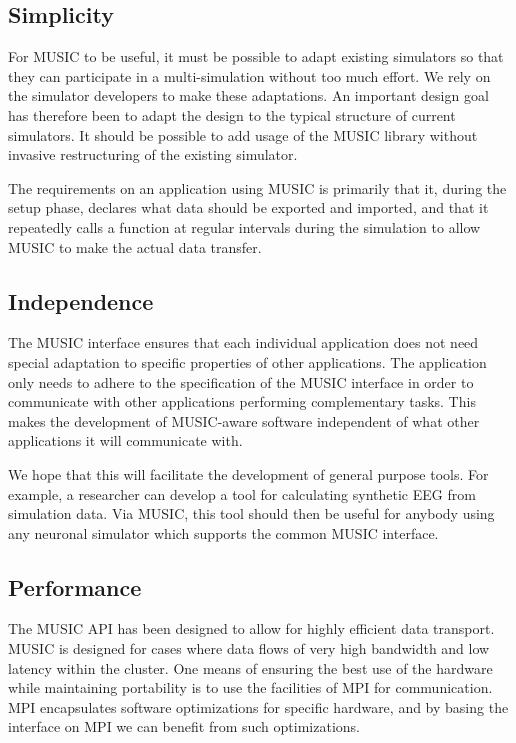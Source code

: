 \documentclass[a4paper]{report}
\begin{document}
\subsection{Simplicity}

For MUSIC to be useful, it must be possible to adapt existing
simulators so that they can participate in a multi-simulation without
too much effort.  We rely on the simulator developers to make these
adaptations.  An important design goal has therefore been to adapt the
design to the typical structure of current simulators.  It should be
possible to add usage of the MUSIC library without invasive
restructuring of the existing simulator.

The requirements on an application using MUSIC is primarily that it,
during the setup phase, declares what data should be exported and
imported, and that it repeatedly calls a function at regular intervals
during the simulation to allow MUSIC to make the actual data transfer.


\subsection{Independence}

The MUSIC interface ensures that each individual application does not
need special adaptation to specific properties of other applications.
The application only needs to adhere to the specification of the MUSIC
interface in order to communicate with other applications performing
complementary tasks.  This makes the development of MUSIC-aware
software independent of what other applications it will communicate
with.

We hope that this will facilitate the development of general purpose
tools.  For example, a researcher can develop a tool for calculating
synthetic EEG from simulation data.  Via MUSIC, this tool should then
be useful for anybody using any neuronal simulator which supports the
common MUSIC interface.


\subsection{Performance}

The MUSIC API has been designed to allow for highly efficient data
transport.  MUSIC is designed for cases where data flows of very high
bandwidth and low latency within the cluster.  One means of ensuring
the best use of the hardware while maintaining portability is to use
the facilities of MPI for communication.  MPI encapsulates software
optimizations for specific hardware, and by basing the interface on
MPI we can benefit from such optimizations.
\end{document}
